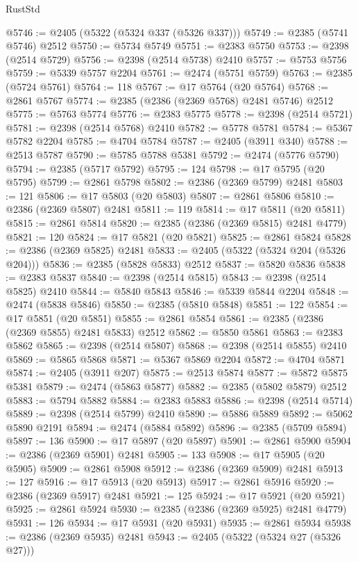 \begin{lexlean}{RustStd}
\begin{coremodule}
{\begin{coremodule}
{{{{{{{{{{{{{{{{{{{{{{{{{{{{{{{{{{{{{{{{{{{{{{{{{{@5746 := @2405 (@5322 (@5324 @337 (@5326 @337)))
@5749 := @2385 (@5741 @5746) @2512
@5750 := @5734 @5749
@5751 := @2383 @5750
@5753 := @2398 (@2514 @5729)
@5756 := @2398 (@2514 @5738) @2410
@5757 := @5753 @5756
@5759 := @5339 @5757 @2204
@5761 := @2474 (@5751 @5759)
@5763 := @2385 (@5724 @5761)
@5764 := 118
@5767 := @17 @5764 (@20 @5764)
@5768 := @2861 @5767
@5774 := @2385 (@2386 (@2369 @5768) @2481 @5746) @2512
@5775 := @5763 @5774
@5776 := @2383 @5775
@5778 := @2398 (@2514 @5721)
@5781 := @2398 (@2514 @5768) @2410
@5782 := @5778 @5781
@5784 := @5367 @5782 @2204
@5785 := @4704 @5784
@5787 := @2405 (@3911 @340)
@5788 := @2513 @5787
@5790 := @5785 @5788 @5381
@5792 := @2474 (@5776 @5790)
@5794 := @2385 (@5717 @5792)
@5795 := 124
@5798 := @17 @5795 (@20 @5795)
@5799 := @2861 @5798
@5802 := @2386 (@2369 @5799) @2481
@5803 := 121
@5806 := @17 @5803 (@20 @5803)
@5807 := @2861 @5806
@5810 := @2386 (@2369 @5807) @2481
@5811 := 119
@5814 := @17 @5811 (@20 @5811)
@5815 := @2861 @5814
@5820 := @2385 (@2386 (@2369 @5815) @2481 @4779)
@5821 := 120
@5824 := @17 @5821 (@20 @5821)
@5825 := @2861 @5824
@5828 := @2386 (@2369 @5825) @2481
@5833 := @2405 (@5322 (@5324 @204 (@5326 @204)))
@5836 := @2385 (@5828 @5833) @2512
@5837 := @5820 @5836
@5838 := @2383 @5837
@5840 := @2398 (@2514 @5815)
@5843 := @2398 (@2514 @5825) @2410
@5844 := @5840 @5843
@5846 := @5339 @5844 @2204
@5848 := @2474 (@5838 @5846)
@5850 := @2385 (@5810 @5848)
@5851 := 122
@5854 := @17 @5851 (@20 @5851)
@5855 := @2861 @5854
@5861 := @2385 (@2386 (@2369 @5855) @2481 @5833) @2512
@5862 := @5850 @5861
@5863 := @2383 @5862
@5865 := @2398 (@2514 @5807)
@5868 := @2398 (@2514 @5855) @2410
@5869 := @5865 @5868
@5871 := @5367 @5869 @2204
@5872 := @4704 @5871
@5874 := @2405 (@3911 @207)
@5875 := @2513 @5874
@5877 := @5872 @5875 @5381
@5879 := @2474 (@5863 @5877)
@5882 := @2385 (@5802 @5879) @2512
@5883 := @5794 @5882
@5884 := @2383 @5883
@5886 := @2398 (@2514 @5714)
@5889 := @2398 (@2514 @5799) @2410
@5890 := @5886 @5889
@5892 := @5062 @5890 @2191
@5894 := @2474 (@5884 @5892)
@5896 := @2385 (@5709 @5894)
@5897 := 136
@5900 := @17 @5897 (@20 @5897)
@5901 := @2861 @5900
@5904 := @2386 (@2369 @5901) @2481
@5905 := 133
@5908 := @17 @5905 (@20 @5905)
@5909 := @2861 @5908
@5912 := @2386 (@2369 @5909) @2481
@5913 := 127
@5916 := @17 @5913 (@20 @5913)
@5917 := @2861 @5916
@5920 := @2386 (@2369 @5917) @2481
@5921 := 125
@5924 := @17 @5921 (@20 @5921)
@5925 := @2861 @5924
@5930 := @2385 (@2386 (@2369 @5925) @2481 @4779)
@5931 := 126
@5934 := @17 @5931 (@20 @5931)
@5935 := @2861 @5934
@5938 := @2386 (@2369 @5935) @2481
@5943 := @2405 (@5322 (@5324 @27 (@5326 @27)))
}}}}}}}}}}}}}}}}}}}}}}}}}}}}}}}}}}}}}}}}}}}}}}}}}}
\end{coremodule}}
\end{coremodule}
\end{lexlean}
